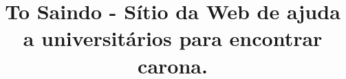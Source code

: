\documentclass{sig-alternate}
\begin{document}
%

\title{{\ttlit To Saindo} - Sítio da Web de ajuda a universitários para encontrar carona.
}
\subtitle{
}
%
%
%
%
%
\end{document}
